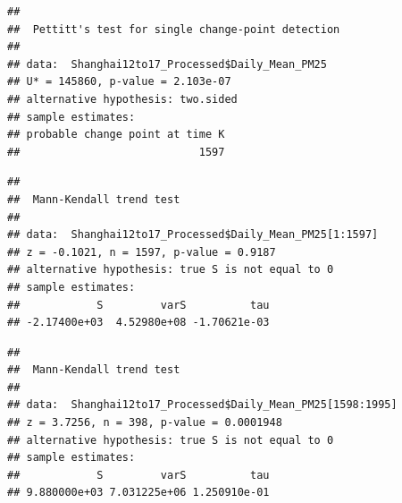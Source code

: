\documentclass[12pt,]{article}
\newenvironment{Shaded}{\begin{snugshade}}{\end{snugshade}}
\newcommand{\KeywordTok}[1]{\textcolor[rgb]{0.13,0.29,0.53}{\textbf{#1}}}
\newcommand{\DecValTok}[1]{\textcolor[rgb]{0.00,0.00,0.81}{#1}}
\newcommand{\CommentTok}[1]{\textcolor[rgb]{0.56,0.35,0.01}{\textit{#1}}}
\newcommand{\OperatorTok}[1]{\textcolor[rgb]{0.81,0.36,0.00}{\textbf{#1}}}
\newcommand{\NormalTok}[1]{#1}
\begin{document}
\begin{Shaded}
\end{Shaded}

\begin{verbatim}
## 
##  Pettitt's test for single change-point detection
## 
## data:  Shanghai12to17_Processed$Daily_Mean_PM25
## U* = 145860, p-value = 2.103e-07
## alternative hypothesis: two.sided
## sample estimates:
## probable change point at time K 
##                            1597
\end{verbatim}

\begin{Shaded}
\end{Shaded}

\begin{verbatim}
## 
##  Mann-Kendall trend test
## 
## data:  Shanghai12to17_Processed$Daily_Mean_PM25[1:1597]
## z = -0.1021, n = 1597, p-value = 0.9187
## alternative hypothesis: true S is not equal to 0
## sample estimates:
##            S         varS          tau 
## -2.17400e+03  4.52980e+08 -1.70621e-03
\end{verbatim}

\begin{Shaded}
\end{Shaded}

\begin{verbatim}
## 
##  Mann-Kendall trend test
## 
## data:  Shanghai12to17_Processed$Daily_Mean_PM25[1598:1995]
## z = 3.7256, n = 398, p-value = 0.0001948
## alternative hypothesis: true S is not equal to 0
## sample estimates:
##            S         varS          tau 
## 9.880000e+03 7.031225e+06 1.250910e-01
\end{verbatim}
\end{document}
